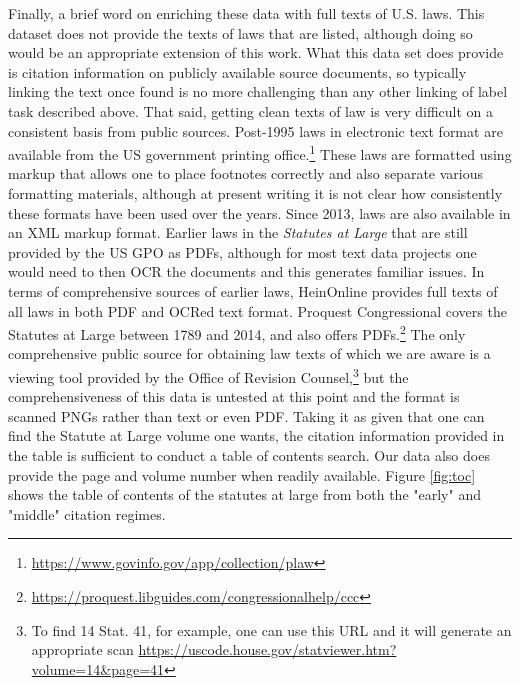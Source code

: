 \documentclass[fleqn,10pt]{wlscirep}
\begin{document}
Finally, a brief word on enriching these data with full texts of U.S. laws. This dataset does not provide the texts of laws that are listed, although doing so would be an appropriate extension of this work. What this data set does provide is citation information on publicly available source documents, so typically linking the text once found is no more challenging than any other linking of label task described above. That said, getting clean texts of law is very difficult on a consistent basis from public sources. Post-1995 laws in electronic text format are available from the US government printing office.\footnote{\url{https://www.govinfo.gov/app/collection/plaw}} These laws are formatted using markup that allows one to place footnotes correctly and also separate various formatting materials, although at present writing it is not clear how consistently these formats have been used over the years. Since 2013, laws are also available in an XML markup format. Earlier laws in the \textit{Statutes at Large} that are still provided by the US GPO as PDFs, although for most text data projects one would need to then OCR the documents and this generates familiar issues. In terms of comprehensive sources of earlier laws, HeinOnline provides full texts of all laws in both PDF and OCRed text format. Proquest Congressional covers the Statutes at Large between 1789 and 2014, and also offers PDFs.\footnote{\url{https://proquest.libguides.com/congressionalhelp/ccc}} The only comprehensive public source for obtaining law texts of which we are aware is a viewing tool provided by the Office of Revision Counsel,\footnote{To find 14 Stat. 41, for example, one can use this URL and it will generate an appropriate scan \url{https://uscode.house.gov/statviewer.htm?volume=14&page=41}} but the comprehensiveness of this data is untested at this point and the format is scanned PNGs rather than text or even PDF. Taking it as given that one can find the Statute at Large volume one wants, the citation information provided in the table is sufficient to conduct a table of contents search. Our data also does provide the page and volume number when readily available. Figure \ref{fig:toc} shows the table of contents of the statutes at large from both the "early" and "middle" citation regimes.










\end{document}
